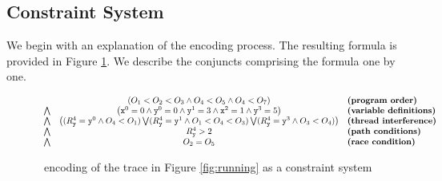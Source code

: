 



\subsection{Constraint System}

We begin with an explanation of the encoding process. The resulting formula is provided in Figure \ref{fig:encoding}. We describe the conjuncts comprising the formula one by one.

\begin{figure*}
	\begin{center}
$$
	\begin{array}{rcl}
	& \left( O_1 < O_2 < O_3 \wedge O_4 < O_5 \wedge O_4 < O_7 \right) & \textbf{(program order)} \\
\bigwedge & \left( {\tt x}^0 = 0 \wedge {\tt y}^0 = 0 \wedge {\tt y}^1 = 3 \wedge 
	{\tt x}^2 = 1 \wedge {\tt y}^3 = 5 \right) & \textbf{(variable definitions)} \\
\bigwedge & \left(		(R_{\tt y}^4={\tt y}^0 \wedge O_4 < O_1) \bigvee	
(R_{\tt y}^4={\tt y}^1 \wedge O_1 < O_4 < O_3) \bigvee
(R_{\tt y}^4={\tt y}^3 \wedge O_3 < O_4)
		\right) & \textbf{(thread interference)} \\
\bigwedge & R_{\tt y}^4 > 2 & \textbf{(path conditions)} \\
\bigwedge & O_2 = O_5 & \textbf{(race condition)}
	\end{array} 
$$
\end{center}
\caption{\label{fig:encoding}\tool\ encoding of the trace in Figure \ref{fig:running} as a constraint system}
\end{figure*}

